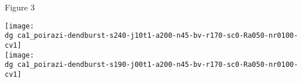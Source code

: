 \documentclass{article}
\newcommand{\dg}{}              %
\newcommand{\figtitle}[1]{}
\begin{document}

\pagebreak[4]

Figure 3

\pagebreak[4]

\noindent\figtitle{Figure 4}


\vspace{\baselineskip}

\noindent\texttt{[image: \\dg ca1\_poirazi-dendburst-s240-j10t1-a200-n45-bv-r170-sc0-Ra050-nr0100-cv1]}\\
\noindent\texttt{[image: \\dg ca1\_poirazi-dendburst-s190-j00t1-a200-n45-bv-r170-sc0-Ra050-nr0100-cv1]}

\end{document}
